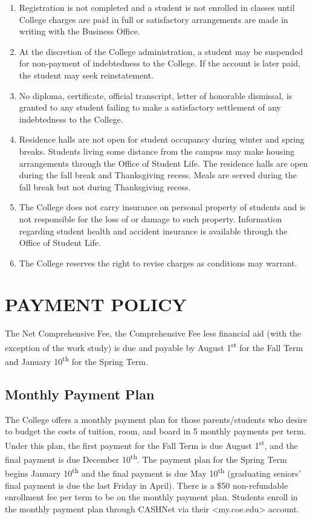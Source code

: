 \documentclass[
  letterpaper,
]{scrbook}
\providecommand{\tightlist}{%
  \setlength{\itemsep}{0pt}\setlength{\parskip}{0pt}}
\begin{document}
\begin{enumerate}
\def\labelenumi{\arabic{enumi}.}
\tightlist
\item
  Registration is not completed and a student is not enrolled in classes
  until College charges are paid in full or satisfactory arrangements
  are made in writing with the Business Office.
\item
  At the discretion of the College administration, a student may be
  suspended for non-payment of indebtedness to the College. If the
  account is later paid, the student may seek reinstatement.
\item
  No diploma, certificate, official transcript, letter of honorable
  dismissal, is granted to any student failing to make a satisfactory
  settlement of any indebtedness to the College.
\item
  Residence halls are not open for student occupancy during winter and
  spring breaks. Students living some distance from the campus may make
  housing arrangements through the Office of Student Life. The residence
  halls are open during the fall break and Thanksgiving recess. Meals
  are served during the fall break but not during Thanksgiving recess.
\item
  The College does not carry insurance on personal property of students
  and is not responsible for the loss of or damage to such property.
  Information regarding student health and accident insurance is
  available through the Office of Student Life.
\item
  The College reserves the right to revise charges as conditions may
  warrant.
\end{enumerate}

\section{PAYMENT POLICY}\label{payment-policy}

The Net Comprehensive Fee, the Comprehensive Fee less financial aid
(with the exception of the work study) is due and payable by August
1\textsuperscript{st} for the Fall Term and January
10\textsuperscript{th} for the Spring Term.

\subsection{Monthly Payment Plan}\label{monthly-payment-plan}

The College offers a monthly payment plan for those parents/students who
desire to budget the costs of tuition, room, and board in 5 monthly
payments per term. Under this plan, the first payment for the Fall Term
is due August 1\textsuperscript{st}, and the final payment is due
December 10\textsuperscript{th}. The payment plan for the Spring Term
begins January 10\textsuperscript{th} and the final payment is due May
10\textsuperscript{th} (graduating seniors' final payment is due the
last Friday in April). There is a \$50 non-refundable enrollment fee per
term to be on the monthly payment plan. Students enroll in the monthly
payment plan through CASHNet via their
\textless my.coe.edu\textgreater{} account.
\end{document}
